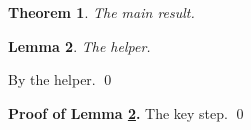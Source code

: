 \documentclass{article}
\newtheorem{theorem}{Theorem}
\newtheorem{lemma}[theorem]{Lemma}
\begin{document}
\begin{theorem}\label{main}
The main result.
\end{theorem}
\begin{lemma}\label{aux}
The helper.
\end{lemma}

 By the helper. \qed

\textbf{Proof of Lemma \ref{aux}.} The key step. \qed
\end{document}
